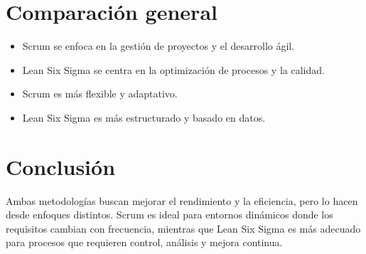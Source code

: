 \documentclass[a4paper,12pt]{article}
\begin{document}
\section{Comparación general}
\begin{itemize}
    \item Scrum se enfoca en la gestión de proyectos y el desarrollo ágil.
    \item Lean Six Sigma se centra en la optimización de procesos y la calidad.
    \item Scrum es más flexible y adaptativo.
    \item Lean Six Sigma es más estructurado y basado en datos.
\end{itemize}

\section{Conclusión}
Ambas metodologías buscan mejorar el rendimiento y la eficiencia, pero lo hacen desde enfoques distintos. Scrum es ideal para entornos dinámicos donde los requisitos cambian con frecuencia, mientras que Lean Six Sigma es más adecuado para procesos que requieren control, análisis y mejora continua.
\end{document}
